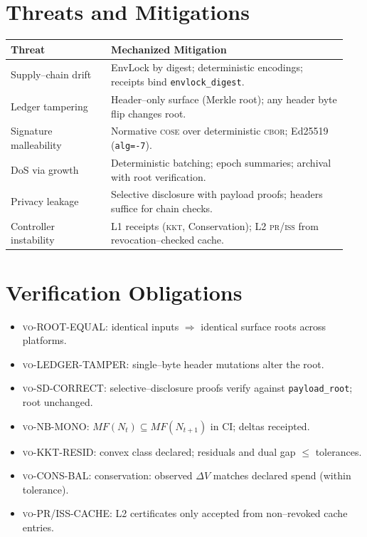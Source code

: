 \documentclass[11pt]{article}
\theoremstyle{plain}
\theoremstyle{remark}
\newcommand{\code}[1]{\texttt{#1}}
\newcommand{\cbor}{\textsc{cbor}}
\newcommand{\cose}{\textsc{cose}}
\newcommand{\iss}{\textsc{iss}}
\newcommand{\pr}{\textsc{pr}}
\newcommand{\kkt}{\textsc{kkt}}
\newcommand{\vo}{\textsc{vo}}
\begin{document}
\section{Threats and Mitigations}
\label{sec:threats}
\begin{center}
\renewcommand{\arraystretch}{1.1}
\begin{tabular}{@{}p{0.28\linewidth}p{0.66\linewidth}@{}}
\toprule
\textbf{Threat} & \textbf{Mechanized Mitigation}\\
\midrule
Supply--chain drift & EnvLock by digest; deterministic encodings; receipts bind \code{envlock\_digest}.\\
Ledger tampering & Header--only surface (Merkle root); any header byte flip changes root.\\
Signature malleability & Normative \cose{} over deterministic \cbor{}; Ed25519 (\code{alg=-7}).\\
DoS via growth & Deterministic batching; epoch summaries; archival with root verification.\\
Privacy leakage & Selective disclosure with payload proofs; headers suffice for chain checks.\\
Controller instability & L1 receipts (\kkt, Conservation); L2 \pr/\iss{} from revocation--checked cache.\\
\bottomrule
\end{tabular}
\end{center}

\section{Verification Obligations}
\label{sec:obligations}
\begin{itemize}
  \item \vo-ROOT-EQUAL: identical inputs $\Rightarrow$ identical surface roots across platforms.
  \item \vo-LEDGER-TAMPER: single--byte header mutations alter the root.
  \item \vo-SD-CORRECT: selective--disclosure proofs verify against \code{payload\_root}; root unchanged.
  \item \vo-NB-MONO: $MF(N_t)\subseteq MF(N_{t+1})$ in CI; deltas receipted.
  \item \vo-KKT-RESID: convex class declared; residuals and dual gap $\le$ tolerances.
  \item \vo-CONS-BAL: conservation: observed $\Delta V$ matches declared spend (within tolerance).
  \item \vo-PR/ISS-CACHE: L2 certificates only accepted from non--revoked cache entries.
\end{itemize}
\end{document}
